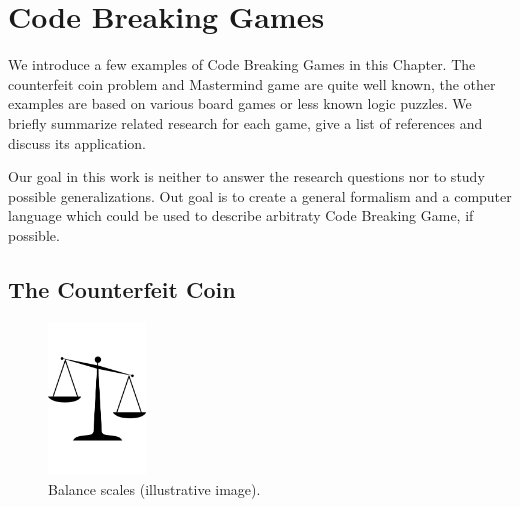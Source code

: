 \chapter{Code Breaking Games}
\label{ch:games}
We introduce a few examples of Code Breaking Games in this Chapter.
The counterfeit coin problem and Mastermind game are quite well known,
  the other examples are based on various board games or less known
  logic puzzles.
We briefly summarize related research for each game, give a list of
  references and discuss its application.

Our goal in this work is neither to answer the research questions nor
  to study possible generalizations.
Out goal is to create a general formalism and a computer language which could
  be used to describe arbitraty Code Breaking Game, if possible.

\section{The Counterfeit Coin}

\begin{figure}
  \begin{center}
  \vspace{-5mm}
  \includegraphics[width=0.23\textwidth]{pictures/scales.pdf}
  \vspace{-5mm}
  \end{center}
  \caption{Balance scales (illustrative image)\protect\footnotemark.}
  \vspace{-10mm}
\end{figure}

